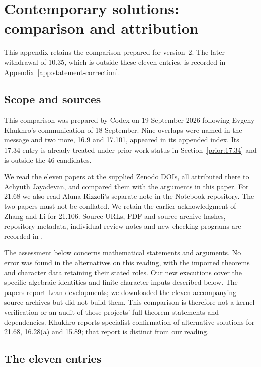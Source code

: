 \clearpage
\section{Contemporary solutions: comparison and attribution}
\label{app:contemporary-comparison}

This appendix retains the comparison prepared for version~2.
The later withdrawal of 10.35, which is outside these eleven entries,
is recorded in Appendix~\ref{app:statement-correction}.

\subsection{Scope and sources}

This comparison was prepared by Codex on 19 September 2026 following
Evgeny Khukhro's communication of 18 September. Nine overlaps were
named in the message and two more, 16.9 and 17.101, appeared in its
appended index. Its 17.34 entry is already treated under prior-work
status in Section~\ref{prior:17.34} and is outside the 46 candidates.

We read the eleven papers at the supplied Zenodo DOIs, all attributed
there to Achyuth Jayadevan, and compared them with the arguments in
this paper. For 21.68 we also read Aluna Rizzoli's separate note in the
Notebook repository. The two papers must not be conflated. We retain
the earlier acknowledgment of Zhang and Li for 21.106. Source URLs,
PDF and source-archive hashes, repository metadata, individual review
notes and new checking programs are recorded in
.

The assessment below concerns mathematical statements and arguments.
No error was found in the alternatives on this reading, with the
imported theorems and character data retaining their stated roles.
Our new executions cover the specific algebraic identities and finite
character inputs described below. The papers report Lean developments;
we downloaded the eleven accompanying source archives but did not
build them. This comparison is therefore not a kernel verification or
an audit of those projects' full theorem statements and dependencies.
Khukhro reports specialist confirmation of alternative solutions for
21.68, 16.28(a) and 15.89; that report is distinct from our reading.

\subsection{The eleven entries}

